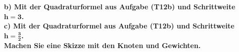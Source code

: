\documentclass[10pt,a4paper]{article}
\begin{document}
        \textbf{%
        b) Mit der Quadraturformel aus Aufgabe (T12b) und Schrittweite $\pmb{h=3}$.
        }\\
    
        \textbf{%
        c) Mit der Quadraturformel aus Aufgabe (T12b) und Schrittweite $\pmb{h=\frac{3}{2}}$. \\
        Machen Sie eine Skizze mit den Knoten und Gewichten.
    }\\
	
\end{document}
